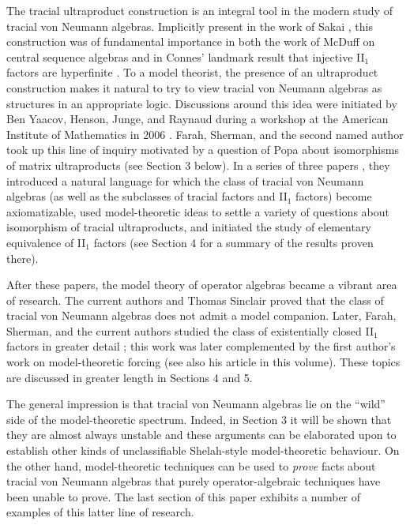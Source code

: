 \documentclass[12pt]{amsart}
\theoremstyle{definition}
\begin{document}
The tracial ultraproduct construction is an integral tool in the modern study of tracial von Neumann algebras.  Implicitly present in the work of Sakai \cite{sakai}, this construction was of fundamental importance in both the work of McDuff \cite{mcduff} on central sequence algebras and in Connes' landmark result that injective II$_1$ factors are hyperfinite \cite{connes}.   To a model theorist, the presence of an ultraproduct construction makes it natural to try to view tracial von Neumann algebras as structures in an appropriate logic. Discussions around this idea were initiated by Ben Yaacov, Henson, Junge,
and Raynaud during a workshop at the American Institute of Mathematics in 2006 \cite{aimworkshop}.  Farah, Sherman, and the second named author took up this line of inquiry motivated by a question of Popa about isomorphisms of matrix ultraproducts (see Section 3 below).  In a series of three papers \cite{mtoa1,mtoa2,mtoa3}, they introduced a natural language for which the class of tracial von Neumann algebras (as well as the subclasses of tracial factors and II$_1$ factors) become axiomatizable, used model-theoretic ideas to settle a variety of questions about isomorphism of tracial ultraproducts, and initiated the study of elementary equivalence of II$_1$ factors (see Section 4 for a summary of the results proven there).

After these papers, the model theory of operator algebras became a vibrant area of research.  The current authors and Thomas Sinclair \cite{GHS} proved that the class of tracial von Neumann algebras does not admit a model companion.  Later, Farah, Sherman, and the current authors studied the class of existentially closed II$_1$ factors in greater detail \cite{ecfactors}; this work was later complemented by the first author's work on model-theoretic forcing \cite{enforceable} (see also his article in this volume).  These topics are discussed in greater length in Sections 4 and 5.

The general impression is that tracial von Neumann algebras lie on the ``wild'' side of the model-theoretic spectrum.  Indeed, in Section 3 it will be shown that they are almost always unstable and these arguments can be elaborated upon to establish other kinds of unclassifiable Shelah-style model-theoretic behaviour.  On the other hand, model-theoretic techniques can be used to \emph{prove} facts about tracial von Neumann algebras that purely operator-algebraic techniques have been unable to prove.  The last section of this paper exhibits a number of examples of this latter line of research.
\end{document}
